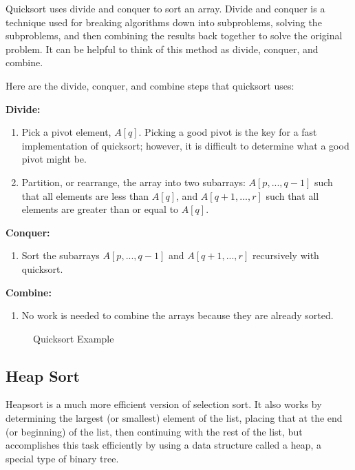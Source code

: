 \documentclass[twoside,12pt,a4paper,english]{book}
\theoremstyle{definition}
\theoremstyle{problemstyle}
\theoremstyle{problemstyle}
\theoremstyle{problemstyle}
\begin{document}
Quicksort uses divide and conquer to sort an array. Divide and conquer is a technique used for breaking algorithms down into subproblems, solving the subproblems, and then combining the results back together to solve the original problem. It can be helpful to think of this method as divide, conquer, and combine.

Here are the divide, conquer, and combine steps that quicksort uses:

\textbf{Divide:}

\begin{enumerate}
\item Pick a pivot element, \texttt{$A[q]$}. Picking a good pivot is the key for a fast implementation of quicksort; however, it is difficult to determine what a good pivot might be.
\item Partition, or rearrange, the array into two subarrays: \texttt{$A[p,...,q-1]$} such that all elements are less than \texttt{$A[q]$}, and \texttt{$A[q+1,...,r]$} such that all elements are greater than or equal to \texttt{$A[q]$}.
\end{enumerate}
\newpage

\textbf{Conquer:}

\begin{enumerate}
\item Sort the subarrays \texttt{$A[p,...,q-1]$} and \texttt{$A[q+1,...,r]$} recursively with quicksort.
\end{enumerate}

\textbf{Combine:}

\begin{enumerate}
\item No work is needed to combine the arrays because they are already sorted.
\end{enumerate}

\begin{figure}[htbp]
  \centering
  

  Quicksort Example
\end{figure}
\newpage

\subsection{Heap Sort}

Heapsort is a much more efficient version of selection sort. It also works by determining the largest (or smallest) element of the list, placing that at the end (or beginning) of the list, then continuing with the rest of the list, but accomplishes this task efficiently by using a data structure called a heap, a special type of binary tree.
\end{document}
